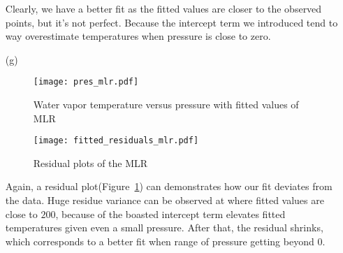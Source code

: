 \documentclass[letter]{article}
\begin{document}
\begin{enumerate}
    Clearly, we have a better fit as the fitted values are closer to the
    observed points, but it's not perfect. Because the intercept term we
    introduced tend to way overestimate temperatures when pressure is close to
    zero. 
    \item[(g)]
    \begin{figure}[htp]
        \centering
        \begin{minipage}[b]{0.45\textwidth}
        \texttt{[image: pres\_mlr.pdf]}
        \caption{Water vapor temperature versus pressure with fitted values of
        MLR}
        \label{fig:pres_mlr}
        \end{minipage}
        \begin{minipage}[b]{0.45\textwidth}
        \texttt{[image: fitted\_residuals\_mlr.pdf]}
        \caption{Residual plots of the MLR}
        \label{fig:res_plot_mlr}
        \end{minipage}
    \end{figure}
    Again, a residual plot(Figure~\ref{fig:res_plot_mlr}) can demonstrates how our fit deviates from the data.
    Huge residue variance can be observed at where fitted values are close to
    $200$, because of the boasted intercept term elevates fitted temperatures
    given even a small pressure. After that, the
    residual shrinks, which corresponds to a better fit when range of pressure
    getting beyond 0.
    \end{enumerate}
\end{document}

